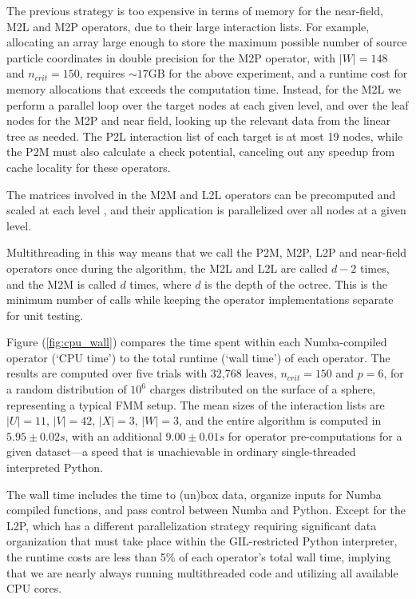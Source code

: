 \documentclass{IEEEcsmag}
\begin{document}
The previous strategy is too expensive in terms of memory for the near-field, M2L and M2P operators, due to their large interaction lists. For example, allocating an array large enough to store the maximum possible number of source particle coordinates in double precision for the M2P operator, with $|W|=148$ and $n_{crit}=150$, requires $\sim 17$GB for the above experiment, and a runtime cost for memory allocations that exceeds the computation time. Instead, for the M2L we perform a parallel loop over the target nodes at each given level, and over the leaf nodes for the M2P and near field, looking up the relevant data from the linear tree as needed. The P2L interaction list of each target is at most 19 nodes, while the P2M must also calculate a check potential, canceling out any speedup from cache locality for these operators.

The matrices involved in the M2M and L2L operators can be precomputed and scaled at each level \cite{Wang2021}, and their application is parallelized over all nodes at a given level.

Multithreading in this way means that we call the P2M, M2P, L2P and near-field operators once during the algorithm, the M2L and L2L are called $d-2$ times, and the M2M is called $d$ times, where $d$ is the depth of the octree. This is the minimum number of calls while keeping the operator implementations separate for unit testing.

Figure (\ref{fig:cpu_wall}) compares the time spent within each Numba-compiled operator (`CPU time') to the total runtime (`wall time') of each operator. The results are computed over five trials with 32,768 leaves,  $n_{crit}=150$ and $p=6$, for a random distribution of $10^6$ charges distributed on the surface of a sphere, representing a typical FMM setup. The mean sizes of the interaction lists are $|U|=11$, $|V|=42$, $|X|=3$, $|W|=3$, and the entire algorithm is computed in $5.95 \pm 0.02 s$, with an additional $9.00 \pm 0.01 s$ for operator pre-computations for a given dataset---a speed that is unachievable in ordinary single-threaded interpreted Python.

The wall time includes the time to (un)box data, organize inputs for Numba compiled functions, and pass control between Numba and Python. Except for the L2P, which has a different parallelization strategy  requiring significant data organization that must take place within the GIL-restricted Python interpreter, the runtime costs are less than 5\% of each operator's total wall time, implying that we are nearly always running multithreaded code and utilizing all available CPU cores. 
\end{document}
